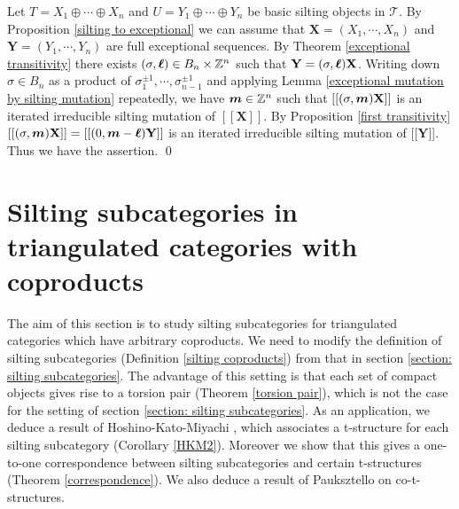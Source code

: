 \documentclass[a4paper,reqno]{amsart}
\theoremstyle{definition}
\newcommand{\TT}{{\mathcal T}}
\newcommand{\Z}{\mathbb{Z}}
\begin{document}
Let $T=X_1\oplus\cdots\oplus X_n$ and $U=Y_1\oplus\cdots\oplus Y_n$
be basic silting objects in $\TT$.
By Proposition \ref{silting to exceptional} we can assume that
${\mathbf X}=(X_1,\cdots,X_n)$ and ${\mathbf Y}=(Y_1,\cdots,Y_n)$ are
full exceptional sequences.
By Theorem \ref{exceptional transitivity} there exists
$(\sigma,\mbox{\boldmath $\ell$})\in B_n\times\Z^n$ such that ${\mathbf Y}=(\sigma,\mbox{\boldmath $\ell$}){\mathbf X}$.
Writing down $\sigma\in B_n$ as a product of $\sigma_1^{\pm1},\cdots,\sigma_{n-1}^{\pm1}$ and applying Lemma \ref{exceptional mutation by silting mutation} repeatedly,
we have $\mbox{\boldmath $m$}\in\Z^n$ such that $[[(\sigma,\mbox{\boldmath $m$}){\mathbf X}]]$ is an iterated irreducible silting mutation of $[[{\mathbf X}]]$.
By Proposition \ref{first transitivity}
$[[(\sigma,\mbox{\boldmath $m$}){\mathbf X}]]=[[(0,\mbox{\boldmath $m$}-\mbox{\boldmath $\ell $}){\mathbf Y}]]$
is an iterated irreducible silting mutation of $[[{\mathbf Y}$]].
Thus we have the assertion.
\qed



\section{Silting subcategories in triangulated categories with coproducts} 
\label{Silting subcategories in triangulated categories with coproducts}

The aim of this section is to study silting subcategories for triangulated categories which have arbitrary coproducts. 
We need to modify the definition of silting subcategories (Definition \ref{silting coproducts}) from that in section \ref{section: silting subcategories}.
The advantage of this setting is that each set of compact objects gives rise to a torsion pair (Theorem \ref{torsion pair}),
which is not the case for the setting of section \ref{section: silting subcategories}.
As an application, we deduce a result of Hoshino-Kato-Miyachi \cite{HKM}, which associates a t-structure for each silting subcategory (Corollary \ref{HKM2}).
Moreover we show that this gives a one-to-one correspondence between silting subcategories and certain t-structures (Theorem \ref{correspondence}).
We also deduce a result of Pauksztello \cite{P1,P2} on co-t-structures.
\end{document}
